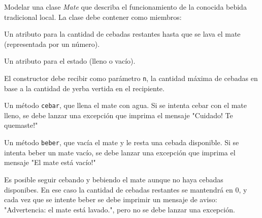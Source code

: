 \begin{ejercicio}
Modelar una clase {\it Mate} que describa el funcionamiento de la
conocida bebida tradicional local. La clase debe contener como miembros:
\begin{partes}
    \item Un atributo para la cantidad de cebadas restantes hasta que se lava
el mate (representada por un número).
    \item Un atributo para el estado (lleno o vacío).
    \item El constructor debe recibir como parámetro \verb!n!, la cantidad
máxima de cebadas en base a la cantidad de yerba vertida en el recipiente.
    \item Un método \verb!cebar!, que llena el mate con agua. Si se intenta
cebar con el mate lleno, se debe lanzar una excepción que imprima el
mensaje "Cuidado! Te quemaste!"
    \item Un método \verb!beber!, que vacía el mate y le resta una cebada
disponible. Si se intenta beber un mate vacío, se debe lanzar una excepción
que imprima el mensaje "El mate está vacío!"
    \item Es posible seguir cebando y bebiendo el mate aunque no haya cebadas
disponibes. En ese caso la cantidad de cebadas restantes se mantendrá
en 0, y cada vez que se intente beber se debe imprimir un mensaje de
aviso: "Advertencia: el mate está lavado.", pero no se debe lanzar una
excepción.
\end{partes}
\end{ejercicio}

